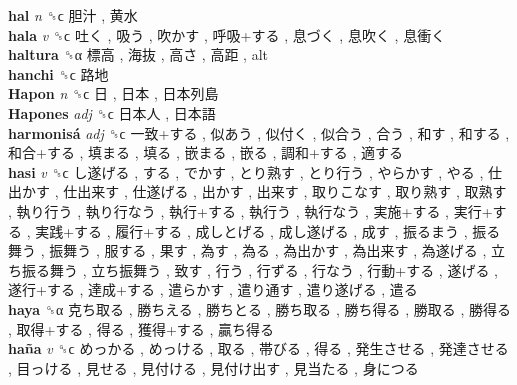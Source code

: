 \textbf{hal} \emph{n}  ␝ϲ   胆汁 ,  黄水   \\
\textbf{hala} \emph{v}  ␝ϲ   吐く ,  吸う ,  吹かす ,  呼吸+する ,  息づく ,  息吹く ,  息衝く   \\
\textbf{haltura} ␝α   標高 ,  海抜 ,  高さ ,  高距 , alt  \\
\textbf{hanchi} ␝ϲ   路地   \\
\textbf{Hapon} \emph{n}  ␝ϲ   日 ,  日本 ,  日本列島   \\
\textbf{Hapones} \emph{adj}  ␝ϲ   日本人 ,  日本語   \\
\textbf{harmonisá} \emph{adj}  ␝ϲ   一致+する ,  似あう ,  似付く ,  似合う ,  合う ,  和す ,  和する ,  和合+する ,  填まる ,  填る ,  嵌まる ,  嵌る ,  調和+する ,  適する   \\
\textbf{hasi} \emph{v}  ␝ϲ   し遂げる ,  する ,  でかす ,  とり熟す ,  とり行う ,  やらかす ,  やる ,  仕出かす ,  仕出来す ,  仕遂げる ,  出かす ,  出来す ,  取りこなす ,  取り熟す ,  取熟す ,  執り行う ,  執り行なう ,  執行+する ,  執行う ,  執行なう ,  実施+する ,  実行+する ,  実践+する ,  履行+する ,  成しとげる ,  成し遂げる ,  成す ,  振るまう ,  振る舞う ,  振舞う ,  服する ,  果す ,  為す ,  為る ,  為出かす ,  為出来す ,  為遂げる ,  立ち振る舞う ,  立ち振舞う ,  致す ,  行う ,  行ずる ,  行なう ,  行動+する ,  遂げる ,  遂行+する ,  達成+する ,  遣らかす ,  遣り通す ,  遣り遂げる ,  遣る   \\
\textbf{haya} ␝α   克ち取る ,  勝ちえる ,  勝ちとる ,  勝ち取る ,  勝ち得る ,  勝取る ,  勝得る ,  取得+する ,  得る ,  獲得+する ,  贏ち得る   \\
\textbf{haña} \emph{v}  ␝ϲ   めっかる ,  めっける ,  取る ,  帯びる ,  得る ,  発生させる ,  発達させる ,  目っける ,  見せる ,  見付ける ,  見付け出す ,  見当たる ,  身につる   \\
